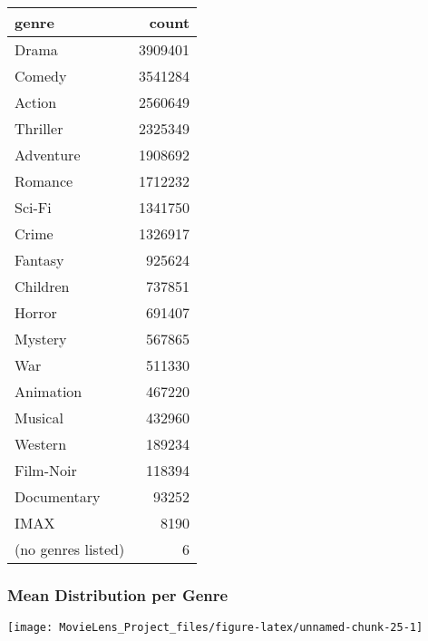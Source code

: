 \documentclass[]{article}
\begin{document}
\begin{table}[H]
\centering\begingroup\fontsize{10}{12}\selectfont

\begin{tabular}{l|r}
\hline
genre & count\\
\hline
Drama & 3909401\\
\hline
Comedy & 3541284\\
\hline
Action & 2560649\\
\hline
Thriller & 2325349\\
\hline
Adventure & 1908692\\
\hline
Romance & 1712232\\
\hline
Sci-Fi & 1341750\\
\hline
Crime & 1326917\\
\hline
Fantasy & 925624\\
\hline
Children & 737851\\
\hline
Horror & 691407\\
\hline
Mystery & 567865\\
\hline
War & 511330\\
\hline
Animation & 467220\\
\hline
Musical & 432960\\
\hline
Western & 189234\\
\hline
Film-Noir & 118394\\
\hline
Documentary & 93252\\
\hline
IMAX & 8190\\
\hline
(no genres listed) & 6\\
\hline
\end{tabular}
\endgroup{}
\end{table}

\hypertarget{mean-distribution-per-genre}{%
\subsubsection{Mean Distribution per
Genre}\label{mean-distribution-per-genre}}

\begin{center}\texttt{[image: MovieLens\_Project\_files/figure-latex/unnamed-chunk-25-1]} \end{center}
\end{document}
